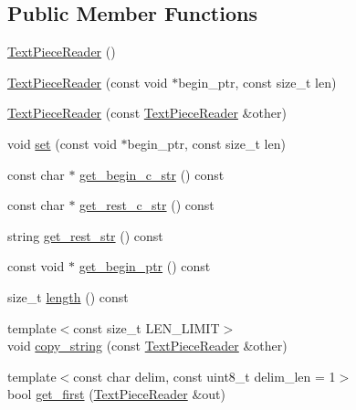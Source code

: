 \subsection*{Public Member Functions}
\begin{DoxyCompactItemize}
\item 
\hyperlink{classuva_1_1utils_1_1file_1_1_text_piece_reader_a7fa12f7f7fa645492cb6215d1f910b58}{Text\+Piece\+Reader} ()
\item 
\hyperlink{classuva_1_1utils_1_1file_1_1_text_piece_reader_a81987774ebeb36071db9023f0b51695b}{Text\+Piece\+Reader} (const void $\ast$begin\+\_\+ptr, const size\+\_\+t len)
\item 
\hyperlink{classuva_1_1utils_1_1file_1_1_text_piece_reader_a55ea3fb57f40425f8f5b211a11eb6e69}{Text\+Piece\+Reader} (const \hyperlink{classuva_1_1utils_1_1file_1_1_text_piece_reader}{Text\+Piece\+Reader} \&other)
\item 
void \hyperlink{classuva_1_1utils_1_1file_1_1_text_piece_reader_a2064d95bd4a748fcb902e499867b1bb4}{set} (const void $\ast$begin\+\_\+ptr, const size\+\_\+t len)
\item 
const char $\ast$ \hyperlink{classuva_1_1utils_1_1file_1_1_text_piece_reader_a9e0eace0d2f16e5379f1afe1f9ec4ad1}{get\+\_\+begin\+\_\+c\+\_\+str} () const 
\item 
const char $\ast$ \hyperlink{classuva_1_1utils_1_1file_1_1_text_piece_reader_ab6d3ca8247786e8a53a16c1ee16335c9}{get\+\_\+rest\+\_\+c\+\_\+str} () const 
\item 
string \hyperlink{classuva_1_1utils_1_1file_1_1_text_piece_reader_ae7f43dc78e668e24f02d78dbe493e60d}{get\+\_\+rest\+\_\+str} () const 
\item 
const void $\ast$ \hyperlink{classuva_1_1utils_1_1file_1_1_text_piece_reader_a03c6d5f47640b1231ebcc4ea0c0a6b20}{get\+\_\+begin\+\_\+ptr} () const 
\item 
size\+\_\+t \hyperlink{classuva_1_1utils_1_1file_1_1_text_piece_reader_a0836ba85b84be3b65bff4d7edaf782a5}{length} () const 
\item 
{\footnotesize template$<$const size\+\_\+t L\+E\+N\+\_\+\+L\+I\+M\+I\+T$>$ }\\void \hyperlink{classuva_1_1utils_1_1file_1_1_text_piece_reader_ac09b0d1598eed173f2060fd8e6db42ae}{copy\+\_\+string} (const \hyperlink{classuva_1_1utils_1_1file_1_1_text_piece_reader}{Text\+Piece\+Reader} \&other)
\item 
{\footnotesize template$<$const char delim, const uint8\+\_\+t delim\+\_\+len = 1$>$ }\\bool \hyperlink{classuva_1_1utils_1_1file_1_1_text_piece_reader_a0326d558a7af2378d113f1bed5444802}{get\+\_\+first} (\hyperlink{classuva_1_1utils_1_1file_1_1_text_piece_reader}{Text\+Piece\+Reader} \&out)

\end{DoxyCompactItemize}
